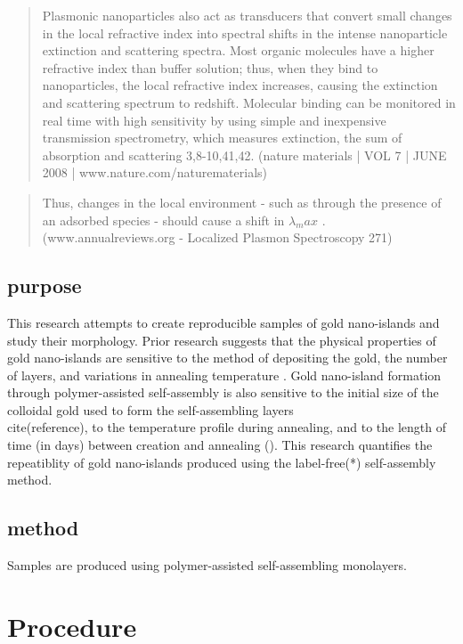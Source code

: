 \documentclass[12pt,oneside,english]{article}
\begin{document}
	
\begin{quote}
Plasmonic nanoparticles also act as transducers that convert small changes in the local refractive index into spectral shifts in the intense nanoparticle extinction and scattering spectra. 
Most organic molecules have a higher refractive index than buffer solution; 
thus, when they bind to nanoparticles, the local refractive index increases, causing the extinction and scattering spectrum to redshift. 
Molecular binding can be monitored in real time with high sensitivity by using simple and inexpensive transmission spectrometry, which measures extinction, the sum of absorption and scattering 3,8-10,41,42. 
(nature materials | VOL 7 | JUNE 2008 | www.nature.com/naturematerials)
\end{quote}

\begin{quote}
Thus, changes in the local environment - such as through the presence of an adsorbed species - should cause a shift in $\lambda_max$ .
(www.annualreviews.org - Localized Plasmon Spectroscopy
271)
\end{quote}

	\subsection{purpose}
	This research attempts to create reproducible samples of gold nano-islands and study their morphology.
	Prior research suggests that the physical properties of gold nano-islands are sensitive to the method of depositing the gold, the number of layers, and variations in annealing temperature \cite{shon11}.  
	Gold nano-island formation through polymer-assisted self-assembly is also sensitive to the initial size of the colloidal gold used to form the self-assembling layers \\cite(reference), to the temperature profile during annealing, and to the length of time (in days) between creation and annealing (\cite{joshi}).
	This research quantifies the repeatiblity of gold nano-islands produced using the label-free(*) self-assembly method.


	\subsection{method}
	Samples are produced using polymer-assisted self-assembling monolayers.

	\section{Procedure}
\end{document}
